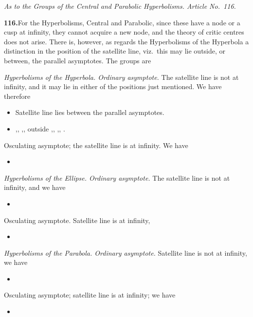 \documentclass[11pt]{article}
\begin{document}
\bigskip
\noindent\textit{As to the Groups of the Central and Parabolic Hyperbolisms. Article No.~116.}

\medskip
\textbf{116.}\quad For the Hyperbolisms, Central and Parabolic, since these have a node or a cusp at infinity, they cannot acquire a new node, and the theory of critic centres does not arise. There is, however, as regards the Hyperbolisms of the Hyperbola a distinction in the position of the satellite line, viz.\ this may lie outside, or between, the parallel asymptotes. The groups are
\smallskip

\noindent\emph{Hyperbolisms of the Hyperbola. Ordinary asymptote.} The satellite line is not at infinity, and it may lie in either of the positions just mentioned. We have therefore
\begin{itemize}\itemsep0pt
\item[XLVIII.] Satellite line lies between the parallel asymptotes.
\item[XLIX.] ,, ,, outside ,, ,, .
\end{itemize}

\noindent Osculating asymptote; the satellite line is at infinity. We have
\begin{itemize}\itemsep0pt
\item[L.]
\end{itemize}

\noindent\emph{Hyperbolisms of the Ellipse. Ordinary asymptote.} The satellite line is not at infinity, and we have
\begin{itemize}\itemsep0pt
\item[LI.]
\end{itemize}

\noindent Osculating asymptote. Satellite line is at infinity,
\begin{itemize}\itemsep0pt
\item[LII.]
\end{itemize}

\noindent\emph{Hyperbolisms of the Parabola. Ordinary asymptote.} Satellite line is not at infinity, we have
\begin{itemize}\itemsep0pt
\item[LIII.]
\end{itemize}

\noindent Osculating asymptote; satellite line is at infinity; we have
\begin{itemize}\itemsep0pt
\item[LIV.]
\end{itemize}
\end{document}
